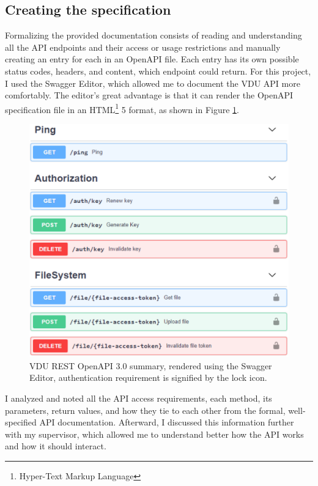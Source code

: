 \subsection{Creating the specification}
Formalizing the provided documentation consists of reading and understanding all the API endpoints and their access or usage restrictions and manually creating an entry for each in an OpenAPI file. Each entry has its own possible status codes, headers, and content, which endpoint could return. For this project, I used the Swagger Editor, which allowed me to document the VDU API more comfortably. The editor's great advantage is that it can render the OpenAPI specification file in an HTML\footnote{Hyper-Text Markup Language} 5 format, as shown in Figure \ref{swagger_result}.

\begin{figure}[htb]
	\centering
	\includegraphics[width=\columnwidth]{obrazky-figures/swagger_result.pdf}
	\caption{VDU REST OpenAPI 3.0 summary, rendered using the Swagger Editor, authentication requirement is signified by the lock icon.}
	\label{swagger_result}
\end{figure}

I analyzed and noted all the API access requirements, each method, its parameters, return values, and how they tie to each other from the formal, well-specified API documentation. Afterward, I discussed this information further with my supervisor, which allowed me to understand better how the API works and how it should interact.

